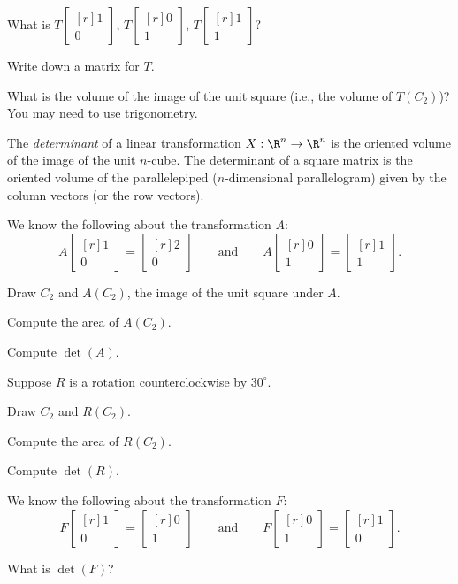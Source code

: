 \documentclass{problemset}
\newcommand{\mat}[1]{\begin{bmatrix*}[r]#1\end{bmatrix*}}
\begin{document}
	\begin{parts}
		\item What is $T\mat{1\\0}$, $T\mat{0\\1}$, $T\mat{1\\1}$?
		\item Write down a matrix for $T$.
		\item What is the volume of the image of the unit square (i.e., the volume of $T(C_2)$)?  You may need
			to use trigonometry.
	\end{parts}
	
	\begin{definition}[Determinant]
	The \emph{determinant} of a linear transformation $X:\R^n\to \R^n$ is the 
	oriented volume of the image of the unit $n$-cube.  The determinant
	of a square matrix is the oriented volume of the parallelepiped 
		($n$-dimensional parallelogram) given by the column vectors (or the row
		vectors).
	\end{definition}

	\question
	We know the following about the transformation $A$:
	\[
		A\mat{1\\0}=\mat{2\\0}\qquad\text{and}\qquad A\mat{0\\1}=\mat{1\\1}.
	\]
	\begin{parts}
	\item Draw $C_2$ and $A(C_2)$, the image of the unit square
			under $A$.
		\item Compute the area of $A (C_2)$.
		\item Compute $\det(A)$.
	\end{parts}

	\question
	Suppose $R$ is a rotation counterclockwise by $30^\circ$.
	\begin{parts}
	\item Draw $C_2$ and $R(C_2)$.
	\item Compute the area of $R(C_2)$.
		\item Compute $\det(R)$.
	\end{parts}
	
	\question
	We know the following about the transformation $F$:
	\[
		F\mat{1\\0}=\mat{0\\1}\qquad\text{and}\qquad F\mat{0\\1}=\mat{1\\0}.
	\]
	\begin{parts}
		\item What is $\det(F)$?
	\end{parts}
\end{document}
